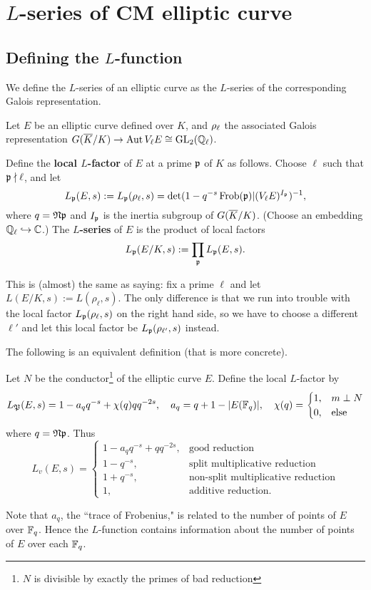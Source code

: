 \section{$L$-series of CM elliptic curve}
\subsection{Defining the $L$-function}
We define the $L$-series of an elliptic curve as the $L$-series of the corresponding Galois representation.
\begin{df}%
Let $E$ be an elliptic curve defined over $K$, and $\rho_{\ell}$ the associated Galois representation $G(\overline{K}/K)\to \operatorname{Aut} V_{\ell}E\cong \operatorname{GL}_2(\mathbb{Q}_{\ell})$.

Define the \textbf{local $L$-factor} of $E$ at a prime $\mathfrak{p}$ of $K$ as follows. Choose $\ell$ such that $\mathfrak{p}\nmid \ell$, and let 
\[
L_{\mathfrak{p}}(E,s):=L_{\mathfrak{p}}(\rho_{\ell},s)=\det(1-q^{-s}\operatorname{Frob}(\mathfrak{p})| (V_{\ell}E)^{I_{\mathfrak{p}}})^{-1},
\]
where $q=\mathfrak{N}\mathfrak{p}$ and $I_{\mathfrak{p}}$ is the inertia subgroup of $G(\overline{K}/K)$. (Choose an embedding $\mathbb{Q}_{\ell}\hookrightarrow \mathbb{C}$.)
The \textbf{$L$-series} of $E$ is the product of local factors
\[
L_{\mathfrak{p}}(E/K,s):=\prod_{\mathfrak{p}} L_{\mathfrak{p}}(E,s).
\]
\end{df}
\begin{rem}
This is (almost) the same as saying: fix a prime $\ell$ and let  $L(E/K,s):=L(\rho_{\ell},s)$. The only difference is that we run into trouble with the local factor $L_{\mathfrak{p}}(\rho_{\ell},s)$ on the right hand side, so we have to choose a different $\ell'$ and let this local factor be $L_{\mathfrak{p}}(\rho_{\ell'},s)$ instead.
\end{rem}
The following is an equivalent definition (that is more concrete).
\begin{df}
Let $N$ be the conductor\footnote{$N$ is divisible by exactly the primes of bad reduction} of the elliptic curve $E$. Define the local $L$-factor by
\[
L_{\mathfrak{P}}(E,s)=1-a_qq^{-s}+\chi(q)qq^{-2s},\quad a_q=q+1-|E(\mathbb{F}_q)|,\quad \chi(q)=\begin{cases}
1,&m\perp N\\
0,&\text{else}
\end{cases}
\]
where $q=\mathfrak{N} \mathfrak{p}$. 
Thus
\[
L_v(E,s)=\begin{cases}
1-a_qq^{-s}+qq^{-2s},&\text{good reduction}\\
1-q^{-s},&\text{split multiplicative reduction}\\
1+q^{-s},&\text{non-split multiplicative reduction}\\
1,&\text{additive reduction.}
\end{cases}
\]
\end{df}
Note that $a_q$, the ``trace of Frobenius," is related to the number of points of $E$ over $\mathbb{F}_q$. Hence the $L$-function contains information about the number of points of $E$ over each $\mathbb{F}_q$.

